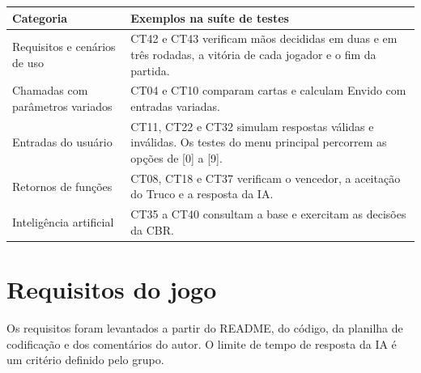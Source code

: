 \documentclass[11pt,a4paper]{article}
\begin{document}
\begin{tabularx}{\textwidth}{>{\raggedright\arraybackslash}p{}L}
\toprule
{}\textbf{Categoria} & \textbf{Exemplos na suíte de testes} \\
\midrule
Requisitos e cenários de uso & CT42 e CT43 verificam mãos decididas em duas e em três rodadas, a vitória de cada jogador e o fim da partida. \\
Chamadas com parâmetros variados & CT04 e CT10 comparam cartas e calculam Envido com entradas variadas. \\
Entradas do usuário & CT11, CT22 e CT32 simulam respostas válidas e inválidas. Os testes do menu principal percorrem as opções de [0] a [9]. \\
Retornos de funções & CT08, CT18 e CT37 verificam o vencedor, a aceitação do Truco e a resposta da IA. \\
Inteligência artificial & CT35 a CT40 consultam a base e exercitam as decisões da CBR. \\
\bottomrule
\end{tabularx}

\section{Requisitos do jogo}

Os requisitos foram levantados a partir do README, do código, da planilha de codificação e dos comentários do autor. O limite de tempo de resposta da IA é um critério definido pelo grupo.
\end{document}
